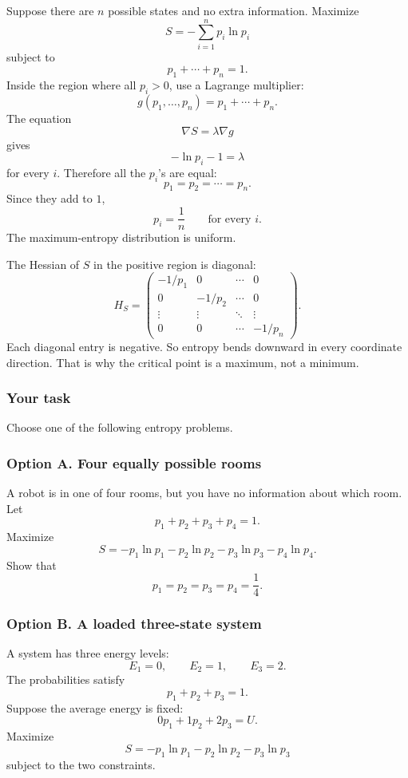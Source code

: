 Suppose there are \(n\) possible states and no extra information.  Maximize
\[
    S=-\sum_{i=1}^n p_i\ln p_i
\]
subject to
\[
    p_1+\cdots+p_n=1.
\]
Inside the region where all \(p_i>0\), use a Lagrange multiplier:
\[
    g(p_1,\ldots,p_n)=p_1+\cdots+p_n.
\]
The equation
\[
    \nabla S=\lambda\nabla g
\]
gives
\[
    -\ln p_i-1=\lambda
\]
for every \(i\).  Therefore all the \(p_i\)'s are equal:
\[
    p_1=p_2=\cdots=p_n.
\]
Since they add to \(1\),
\[
\boxed{
    p_i=\frac1n
    \qquad
    \text{for every }i.
}
\]
The maximum-entropy distribution is uniform.

The Hessian of \(S\) in the positive region is diagonal:
\[
    H_S=
    \begin{pmatrix}
    -1/p_1&0&\cdots&0\\
    0&-1/p_2&\cdots&0\\
    \vdots&\vdots&\ddots&\vdots\\
    0&0&\cdots&-1/p_n
    \end{pmatrix}.
\]
Each diagonal entry is negative.  So entropy bends downward in every coordinate
direction.  That is why the critical point is a maximum, not a minimum.

\subsubsection*{Your task}

Choose one of the following entropy problems.

\subsubsection*{Option A. Four equally possible rooms}

A robot is in one of four rooms, but you have no information about which room.  Let
\[
    p_1+p_2+p_3+p_4=1.
\]
Maximize
\[
    S=-p_1\ln p_1-p_2\ln p_2-p_3\ln p_3-p_4\ln p_4.
\]
Show that
\[
\boxed{
    p_1=p_2=p_3=p_4=\frac14.
}
\]

\subsubsection*{Option B. A loaded three-state system}

A system has three energy levels:
\[
    E_1=0,\qquad E_2=1,\qquad E_3=2.
\]
The probabilities satisfy
\[
    p_1+p_2+p_3=1.
\]
Suppose the average energy is fixed:
\[
    0p_1+1p_2+2p_3=U.
\]
Maximize
\[
    S=-p_1\ln p_1-p_2\ln p_2-p_3\ln p_3
\]
subject to the two constraints.

